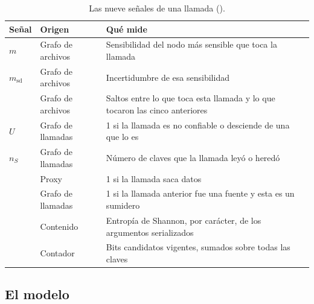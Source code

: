 \begin{table}[ht]
\caption{Las nueve señales de una llamada ().}\label{tab:senales}
\small
\begin{tabularx}{\textwidth}{@{}P{3.7cm}P{1.9cm}L@{}}
\toprule
Señal & Origen & Qué mide \\
\midrule
$m$ & Grafo de archivos & Sensibilidad del nodo más sensible que toca la llamada \\
$m_{\mathrm{sd}}$ & Grafo de archivos & Incertidumbre de esa sensibilidad \\
 & Grafo de archivos & Saltos entre lo que toca esta llamada y lo que tocaron las cinco
  anteriores \\
$U$ & Grafo de llamadas & 1 si la llamada es no confiable o desciende de una que lo es \\
$n_S$ & Grafo de llamadas & Número de claves que la llamada leyó o heredó \\
 & Proxy & 1 si la llamada saca datos \\
 & Grafo de llamadas & 1 si la llamada anterior fue una fuente y esta es un
  sumidero \\
 & Contenido & Entropía de Shannon, por carácter, de los argumentos serializados \\
 & Contador & Bits candidatos vigentes, sumados sobre todas las claves \\
\bottomrule
\end{tabularx}
\end{table}

\subsection{El modelo}

